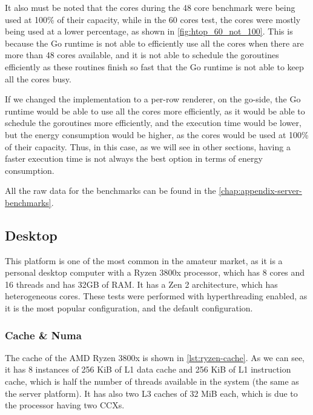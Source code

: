 It also must be noted that the cores during the 48 core benchmark were being used at 100\% of their capacity, while in the 60 cores test, the cores were mostly being used at a lower percentage, as shown in \autoref{fig:htop_60_not_100}. This is because the Go runtime is not able to efficiently use all the cores when there are more than 48 cores available, and it is not able to schedule the goroutines efficiently as these routines finish so fast that the Go runtime is not able to keep all the cores busy.

If we changed the implementation to a per-row renderer, on the go-side, the Go runtime would be able to use all the cores more efficiently, as it would be able to schedule the goroutines more efficiently, and the execution time would be lower, but the energy consumption would be higher, as the cores would be used at 100\% of their capacity. Thus, in this case, as we will see in other sections, having a faster execution time is not always the best option in terms of energy consumption.


All the raw data for the benchmarks can be found in the \autoref{chap:appendix-server-benchmarks}.




\subsection{Desktop}
This platform is one of the most common in the amateur market, as it is a personal desktop computer with a Ryzen 3800x processor, which has 8 cores and 16 threads and has 32GB of RAM. It has a Zen 2 architecture, which has heterogeneous cores. These tests were performed with hyperthreading enabled, as it is the most popular configuration, and the default configuration. 

\subsubsection{Cache \& Numa}
The cache of the AMD Ryzen 3800x is shown in \autoref{lst:ryzen-cache}. As we can see, it has 8 instances of 256 KiB of L1 data cache and 256 KiB of L1 instruction cache, which is half the number of threads available in the system (the same as the server platform). It has also two L3 caches of 32 MiB each, which is due to the processor having two \glspl{CCX}. 

